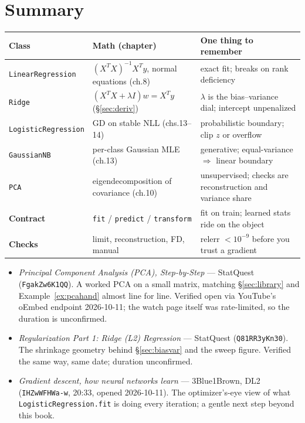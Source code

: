 \section{Summary}\label{sec:mlscratch-summary}

\begin{center}
\footnotesize
\begin{tabular}{@{}p{3.5cm}p{4.6cm}p{5.3cm}@{}}
\toprule
\textbf{Class} & \textbf{Math (chapter)} & \textbf{One thing to remember} \\
\midrule
\texttt{LinearRegression} & $(X^TX)^{-1}X^Ty$, normal
equations (ch.8) & exact fit; breaks on rank deficiency \\
\texttt{Ridge} & $(X^TX{+}\lambda I)w=X^Ty$ (\S\ref{sec:deriv}) &
$\lambda$ is the bias--variance dial; intercept unpenalized \\
\texttt{LogisticRegression} & GD on stable NLL (chs.13--14) &
probabilistic boundary; clip $z$ or overflow \\
\texttt{GaussianNB} & per-class Gaussian MLE (ch.13) & generative;
equal-variance $\Rightarrow$ linear boundary \\
\texttt{PCA} & eigendecomposition of covariance (ch.10) &
unsupervised; checks are reconstruction and variance share \\
\midrule
\textbf{Contract} & \texttt{fit} / \texttt{predict} /
\texttt{transform} & fit on train; learned stats ride on the object \\
\textbf{Checks} & limit, reconstruction, FD, manual &
relerr $<10^{-9}$ before you trust a gradient \\
\bottomrule
\end{tabular}
\end{center}

\begin{rulebox}
\begin{itemize}
\item \emph{Principal Component Analysis (PCA), Step-by-Step} ---
StatQuest (\texttt{FgakZw6K1QQ}). A worked PCA on a small matrix,
matching \S\ref{sec:library} and Example~\ref{ex:pcahand} almost
line for line. Verified open via YouTube's oEmbed endpoint
2026-10-11; the watch page itself was rate-limited, so the duration
is unconfirmed.
\item \emph{Regularization Part 1: Ridge (L2) Regression} ---
StatQuest (\texttt{Q81RR3yKn30}). The shrinkage geometry behind
\S\ref{sec:biasvar} and the sweep figure. Verified the same way,
same date; duration unconfirmed.
\item \emph{Gradient descent, how neural networks learn} ---
3Blue1Brown, DL2 (\texttt{IHZwWFHWa-w}, 20:33, opened 2026-10-11).
The optimizer's-eye view of what \texttt{LogisticRegression.fit} is
doing every iteration; a gentle next step beyond this book.
\end{itemize}
\end{rulebox}

